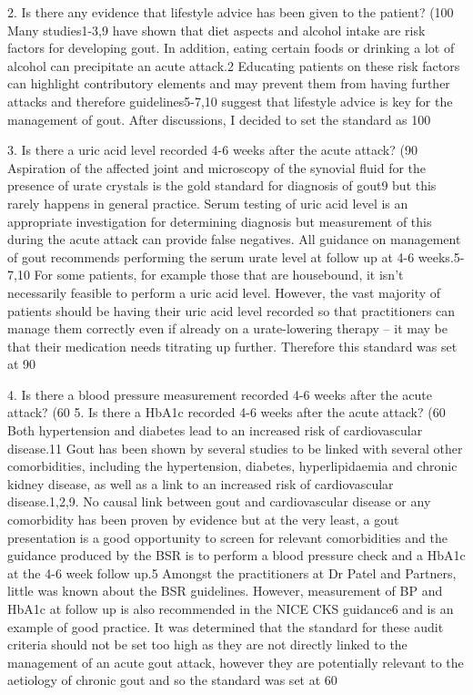\documentclass[paper=a4,fontsize=11pt,twocolumn]{article}
\begin{document}
2.	Is there any evidence that lifestyle advice has been given to the patient? (100%
Many studies1-3,9 have shown that diet aspects and alcohol intake are risk factors for developing gout. In addition, eating certain foods or drinking a lot of alcohol can precipitate an acute attack.2 Educating patients on these risk factors can highlight contributory elements and may prevent them from having further attacks and therefore guidelines5-7,10 suggest that lifestyle advice is key for the management of gout.
After discussions, I decided to set the standard as 100%

3.	Is there a uric acid level recorded 4-6 weeks after the acute attack? (90%
Aspiration of the affected joint and microscopy of the synovial fluid for the presence of urate crystals is the gold standard for diagnosis of gout9 but this rarely happens in general practice. Serum testing of uric acid level is an appropriate investigation for determining diagnosis but measurement of this during the acute attack can provide false negatives. All guidance on management of gout recommends performing the serum urate level at follow up at 4-6 weeks.5-7,10
For some patients, for example those that are housebound, it isn’t necessarily feasible to perform a uric acid level. However, the vast majority of patients should be having their uric acid level recorded so that practitioners can manage them correctly even if already on a urate-lowering therapy – it may be that their medication needs titrating up further. Therefore this standard was set at 90%

4.	Is there a blood pressure measurement recorded 4-6 weeks after the acute attack? (60%
5.	Is there a HbA1c recorded 4-6 weeks after the acute attack? (60%
Both hypertension and diabetes lead to an increased risk of cardiovascular disease.11 Gout has been shown by several studies to be linked with several other comorbidities, including the hypertension, diabetes, hyperlipidaemia and chronic kidney disease, as well as a link to an increased risk of cardiovascular disease.1,2,9. No causal link between gout and cardiovascular disease or any comorbidity has been proven by evidence but at the very least, a gout presentation is a good opportunity to screen for relevant comorbidities and the guidance produced by the BSR is to perform a blood pressure check and a HbA1c at the 4-6 week follow up.5  
Amongst the practitioners at Dr Patel and Partners, little was known about the BSR guidelines. However, measurement of BP and HbA1c at follow up is also recommended in the NICE CKS guidance6 and is an example of good practice. It was determined that the standard for these audit criteria should not be set too high as they are not directly linked to the management of an acute gout attack, however they are potentially relevant to the aetiology of chronic gout and so the standard was set at 60%
\end{document}
